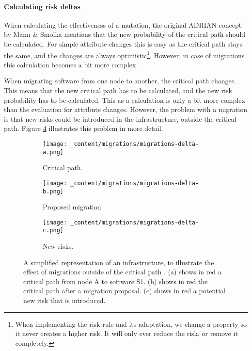\paragraph*{Calculating risk deltas}
When calculating the effectiveness of a mutation, the original ADRIAN concept by Mann \& Smolka \cite{mann2023ADRIAN} mentions that the new probability of the critical path should be calculated. For simple attribute changes this is easy as the critical path stays the same, and the changes are always optimistic\footnote{When implementing the risk rule and its adaptation, we change a property so it never creates a higher risk. It will only ever reduce the risk, or remove it completely.}. However, in case of migrations this calculation becomes a bit more complex. 

When migrating software from one node to another, the critical path changes. This means that the new critical path has to be calculated, and the new risk probability has to be calculated. This as a calculation is only a bit more complex than the evaluation for attribute changes. However, the problem with a migration is that new risks could be introduced in the infrastructure, outside the critical path. Figure \ref{fig:migrations-delta} illustrates this problem in more detail.

\begin{figure}[H]
    \begin{subfigure}[b]{0.3\textwidth}
        \centering
        \texttt{[image: \_content/migrations/migrations-delta-a.png]}
        \caption{Critical path.}
        \label{fig:migrations-delta-attack}
    \end{subfigure}
    \begin{subfigure}[b]{0.3\textwidth}
        \centering
        \texttt{[image: \_content/migrations/migrations-delta-b.png]}
        \caption{Proposed migration.}
        \label{fig:migrations-delta-proposal}
    \end{subfigure}
    \begin{subfigure}[b]{0.3\textwidth}
        \centering
        \texttt{[image: \_content/migrations/migrations-delta-c.png]}
        \caption{New risks.}
        \label{fig:migrations-delta-risks}
    \end{subfigure}
    \caption{A simplified representation of an infrastructure, to illustrate the effect of migrations outside of the critical path . (a) shows in red a critical path from node A to software S1. (b) shows in red the critical path after a migration proposal. (c) shows in red a potential new risk that is introduced.}
    \label{fig:migrations-delta}
\end{figure}

